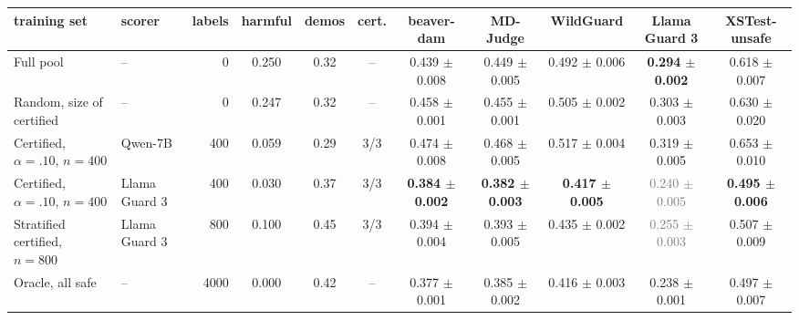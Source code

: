 \begin{tabular}{llrcccccccc}
\toprule
training set & scorer & labels & harmful & demos & cert. & beaver-dam & MD-Judge & WildGuard & Llama Guard 3 & XSTest-unsafe \\
\midrule
Full pool & -- & 0 & 0.250 & 0.32 & -- & 0.439 $\pm$ 0.008 & 0.449 $\pm$ 0.005 & 0.492 $\pm$ 0.006 & \textbf{0.294 $\pm$ 0.002} & 0.618 $\pm$ 0.007 \\
Random, size of certified & -- & 0 & 0.247 & 0.32 & -- & 0.458 $\pm$ 0.001 & 0.455 $\pm$ 0.001 & 0.505 $\pm$ 0.002 & 0.303 $\pm$ 0.003 & 0.630 $\pm$ 0.020 \\
Certified, $\alpha{=}.10$, $n{=}400$ & Qwen-7B & 400 & 0.059 & 0.29 & 3/3 & 0.474 $\pm$ 0.008 & 0.468 $\pm$ 0.005 & 0.517 $\pm$ 0.004 & 0.319 $\pm$ 0.005 & 0.653 $\pm$ 0.010 \\
Certified, $\alpha{=}.10$, $n{=}400$ & Llama Guard 3 & 400 & 0.030 & 0.37 & 3/3 & \textbf{0.384 $\pm$ 0.002} & \textbf{0.382 $\pm$ 0.003} & \textbf{0.417 $\pm$ 0.005} & \textcolor{gray}{0.240 $\pm$ 0.005} & \textbf{0.495 $\pm$ 0.006} \\
Stratified certified, $n{=}800$ & Llama Guard 3 & 800 & 0.100 & 0.45 & 3/3 & 0.394 $\pm$ 0.004 & 0.393 $\pm$ 0.005 & 0.435 $\pm$ 0.002 & \textcolor{gray}{0.255 $\pm$ 0.003} & 0.507 $\pm$ 0.009 \\
Oracle, all safe & -- & 4000 & 0.000 & 0.42 & -- & 0.377 $\pm$ 0.001 & 0.385 $\pm$ 0.002 & 0.416 $\pm$ 0.003 & 0.238 $\pm$ 0.001 & 0.497 $\pm$ 0.007 \\
\bottomrule
\end{tabular}
